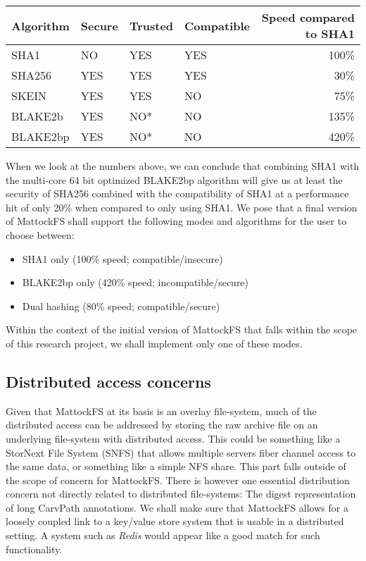 \begin{table}[]
\centering
\begin{tabular}{llllr}
Algorithm & Secure & Trusted & Compatible & Speed compared to SHA1 \\ \hline
SHA1 & NO & YES & YES & 100\% \\
SHA256 & YES & YES & YES & 30\% \\
SKEIN & YES & YES & NO & 75\% \\
BLAKE2b & YES & NO* & NO & 135\% \\
BLAKE2bp & YES & NO* & NO & 420\% \\
\end{tabular}
\end{table}
When we look at the numbers above, we can conclude that combining SHA1 with the multi-core 64 bit optimized BLAKE2bp algorithm will give us at least the security of SHA256 combined with the compatibility of SHA1 at a performance hit of only 20\% when compared to only using SHA1. We pose that a final version of MattockFS shall support the following modes and algorithms for the user to choose between:
\begin{itemize}
\item SHA1 only (100\% speed; compatible/insecure)
\item BLAKE2bp only (420\% speed; incompatible/secure)
\item Dual hashing (80\% speed; compatible/secure)
\end{itemize} 
Within the context of the initial version of MattockFS that falls within the scope of this research project, we shall implement only one of these modes.
\subsection{Distributed access concerns}
Given that MattockFS at its basis is an overlay file-system, much of the distributed access can be addressed by storing the raw archive file on an underlying file-system with distributed access. This could be something like a StorNext File System (SNFS) that allows multiple servers fiber channel access to the same data, or something like a simple NFS share. This part falls outside of the scope of concern for MattockFS.
There is however one essential distribution concern not directly related to distributed file-systems: The digest representation of long CarvPath annotations. We shall make sure that MattockFS allows for a loosely coupled link to a key/value store system that is usable in a distributed setting. A system such as \emph{Redis} would appear like a good match for such functionality. 
